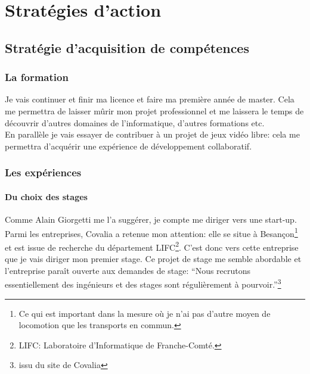 \documentclass[a4paper,12pt, draft]{report}
\begin{document}
\part{Stratégies d'action}

\chapter{Stratégie d'acquisition de compétences}
\section{La formation}
Je vais continuer et finir ma licence et faire ma première année de master.
Cela me permettra de laisser mûrir mon projet professionnel et me laissera le temps de découvrir d'autres domaines de l'informatique, d'autres formations etc.\\
En parallèle je vais essayer de contribuer à un projet de jeux vidéo libre: cela me permettra d'acquérir une expérience de développement collaboratif.
\section{Les expériences}
\subsection{Du choix des stages}
Comme Alain Giorgetti me l'a suggérer, je compte me diriger vers une start-up.
Parmi les entreprises, Covalia a retenue mon attention: elle se situe à Besançon\footnote{Ce qui est important dans la mesure où je n'ai pas d'autre moyen de locomotion que les transports en commun.} et est issue de recherche du département LIFC\footnote{\textsc{LIFC}: Laboratoire d'Informatique de Franche-Comté.}. C'est donc vers cette entreprise que je vais diriger mon premier stage.
Ce projet de stage me semble abordable et l'entreprise paraît ouverte aux demandes de stage: ``Nous recrutons essentiellement des ingénieurs et des stages sont régulièrement à pourvoir.''\footnote{issu du site de Covalia}
\end{document}
